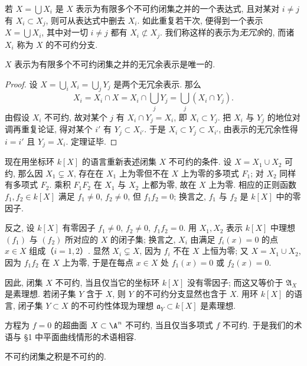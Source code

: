 若 $X = \bigcup X_i$ 是 $X$ 表示为有限多个不可约闭集之并的一个表达式, 且对某对 $i \ne j$ 有 $X_i \subset X_j$, 则可从表达式中删去 $X_i$. 如此重复若干次, 便得到一个表示 $X = \bigcup X_i$, 其中对一切 $i \ne j$ 都有 $X_i \not\subset X_j$. 我们称这样的表示为\emph{无冗余}的, 而诸 $X_i$ 称为 $X$ 的不可约分支.

\begin{theorem}\label{thm:irredundant-unique}
	$X$ 表示为有限多个不可约闭集之并的无冗余表示是唯一的.
\end{theorem}

\begin{proof}
	设 $X = \bigcup_i X_i = \bigcup_j Y_j$ 是两个无冗余表示. 那么
	\[
		X_i = X_i \cap X = X_i \cap \bigcup_j Y_j = \bigcup_j (X_i \cap Y_j).
	\]
	由假设 $X_i$ 不可约, 故对某个 $j$ 有 $X_i \cap Y_j = X_i$, 即 $X_i \subset Y_j$. 把 $X_i$ 与 $Y_j$ 的地位对调再重复论证, 得对某个 $i'$ 有 $Y_j \subset X_{i'}$. 于是 $X_i \subset Y_j \subset X_{i'}$, 由表示的无冗余性得 $i = i'$ 且 $Y_j = X_i$. 定理证毕.
\end{proof}

现在用坐标环 $k[X]$ 的语言重新表述闭集 $X$ 不可约的条件. 设 $X = X_1 \cup X_2$ 可约, 那么因 $X_1 \subsetneq X$, 存在在 $X_1$ 上为零但不在 $X$ 上为零的多项式 $F_1$; 对 $X_2$ 同样有多项式 $F_2$. 乘积 $F_1 F_2$ 在 $X_1$ 与 $X_2$ 上都为零, 故在 $X$ 上为零. 相应的正则函数 $f_1, f_2 \in k[X]$ 满足 $f_1 \ne 0$, $f_2 \ne 0$, 但 $f_1 f_2 = 0$; 换言之, $f_1$ 与 $f_2$ 是 $k[X]$ 中的零因子.

反之, 设 $k[X]$ 有零因子 $f_1 \ne 0$, $f_2 \ne 0$, $f_1 f_2 = 0$. 用 $X_1, X_2$ 表示 $k[X]$ 中理想 $(f_1)$ 与 $(f_2)$ 所对应的 $X$ 的闭子集; 换言之, $X_i$ 由满足 $f_i(x) = 0$ 的点 $x \in X$ 组成（$i = 1, 2$）. 显然 $X_i \subsetneq X$, 因为 $f_i$ 不在 $X$ 上恒为零; 又 $X = X_1 \cup X_2$, 因为 $f_1 f_2$ 在 $X$ 上为零, 于是在每点 $x \in X$ 处 $f_1(x) = 0$ 或 $f_2(x) = 0$.

因此, 闭集 $X$ 不可约, 当且仅当它的坐标环 $k[X]$ 没有零因子; 而这又等价于 $\mathfrak A_X$ 是素理想. 若闭子集 $Y$ 含于 $X$, 则 $Y$ 的不可约分支显然也含于 $X$. 用环 $k[X]$ 的语言, 闭子集 $Y \subset X$ 的不可约性体现为理想 $\mathfrak a_Y \subset k[X]$ 是素理想.

方程为 $f = 0$ 的超曲面 $X \subset \A^n$ 不可约, 当且仅当多项式 $f$ 不可约. 于是我们的术语与 §1 中平面曲线情形的术语相容.

\begin{theorem}\label{thm:product-irreducible}
	不可约闭集之积是不可约的.
\end{theorem}

